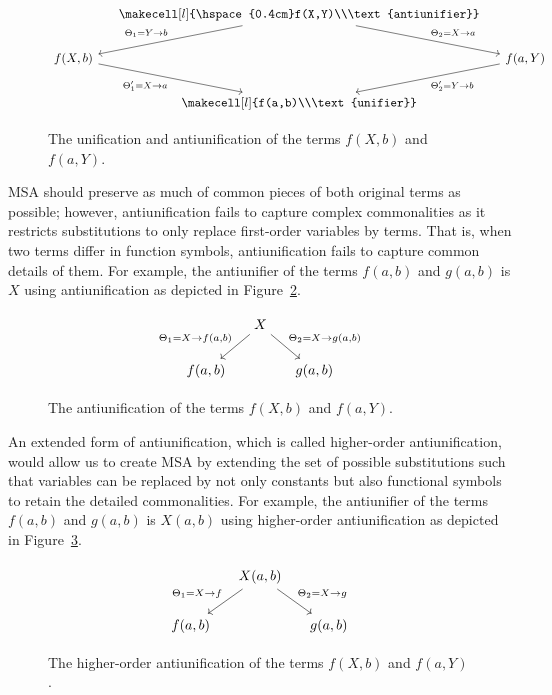 \begin{figure} [H]
  \[
\begin{tikzcd}[column sep=small]
&
  {\makecell[l]{\hspace{0.4cm}f(X,Y)\\\text{antiunifier}}}
  \arrow{dr}{\Theta_2 = X \rightarrow a}
  \arrow[->,swap]{dl}{\Theta_1 = Y \rightarrow b} %
\\
f(X,b)
 \arrow[->,swap]{dr}{\Theta_1' = X \rightarrow a}
&&
f(a, Y)
  \arrow{dl}{\Theta_2' = Y \rightarrow b}
  \\
&
{\makecell[l]{f(a,b)\\\text{unifier}}}
\end{tikzcd}
\]
  \caption{The unification and antiunification of the terms $f(X,b)$ and $f(a,Y)$.}
  \label{fig:uni-anti-uni}
\end{figure}

MSA should preserve as much of common pieces of both original terms as possible; however, antiunification fails to capture complex commonalities as it restricts substitutions to only replace first-order variables by terms. That is, when two terms differ in function symbols, antiunification fails to capture common details of them. For example, the antiunifier of the terms $f(a,b)$ and $g(a,b)$ is $X$ using antiunification as depicted in Figure~\ref{fig:first-anti-uni}.

\begin{figure} [H]
\[
\begin{tikzcd}[column sep=small]
&
  X
  \arrow{dr}{\Theta_2 = X \rightarrow g(a,b)}
  \arrow[->,swap]{dl}{\Theta_1 = X \rightarrow f(a,b)} %
\\
f(a,b)
&&
g(a,b)
\end{tikzcd}
\]
  \caption{The antiunification of the terms $f(X,b)$ and $f(a,Y)$.}
  \label{fig:first-anti-uni}
\end{figure}

An extended form of antiunification, which is called higher-order antiunification, would allow us to create MSA by extending the set of possible substitutions such that variables can be replaced by not only constants but also functional symbols to retain the detailed commonalities. For example, the antiunifier of the terms $f(a,b)$ and $g(a,b)$ is $X(a,b)$ using higher-order antiunification as depicted in Figure~\ref{fig:higher-anti-uni}.
\begin{figure} [H]
\[
\begin{tikzcd}[column sep=small]
&
  X(a,b)
  \arrow{dr}{\Theta_2 = X \rightarrow g}
  \arrow[->,swap]{dl}{\Theta_1 = X \rightarrow f} %
\\
f(a,b)
&&
g(a,b)
\end{tikzcd}
\]
  \caption{The higher-order antiunification of the terms $f(X,b)$ and $f(a,Y)$.}
  \label{fig:higher-anti-uni}
\end{figure}

